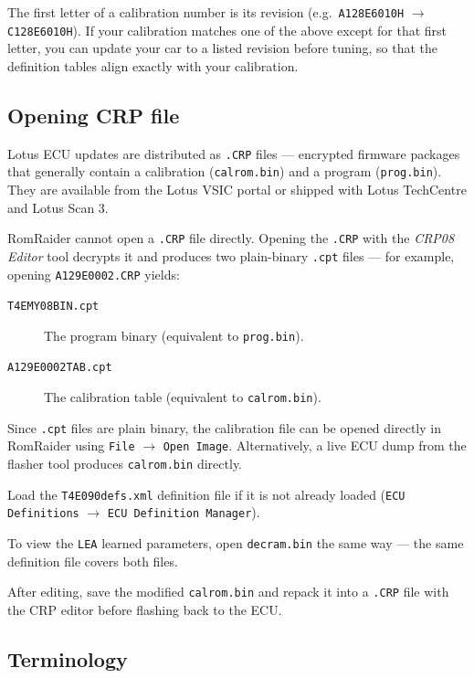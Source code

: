 \documentclass[a4paper,11pt]{article}
\renewcommand{\_}{\oldunderscore\allowbreak}
\begin{document}
The first letter of a calibration number is its revision
(e.g.\ \texttt{A128E6010H} $\to$ \texttt{C128E6010H}). If your calibration
matches one of the above except for that first letter, you can update your car
to a listed revision before tuning, so that the definition tables align exactly
with your calibration.

\subsection{Opening CRP file}

Lotus ECU updates are distributed as \texttt{.CRP} files — encrypted firmware
packages that generally contain a calibration (\texttt{calrom.bin}) and a program
(\texttt{prog.bin}). They are available from the Lotus VSIC portal or shipped
with Lotus TechCentre and Lotus Scan 3.

RomRaider cannot open a \texttt{.CRP} file directly. Opening the \texttt{.CRP}
with the \emph{CRP08 Editor} tool decrypts it and produces two plain-binary
\texttt{.cpt} files — for example, opening \texttt{A129E0002.CRP} yields:

\begin{description}
  \item[\texttt{T4E\_MY08\_BIN.cpt}] The program binary (equivalent to
    \texttt{prog.bin}).
  \item[\texttt{A129E0002\_TAB.cpt}] The calibration table (equivalent to
    \texttt{calrom.bin}).
\end{description}

Since \texttt{.cpt} files are plain binary, the calibration file can be opened
directly in RomRaider using \texttt{File} $\to$ \texttt{Open Image}.
Alternatively, a live ECU dump from the flasher tool produces \texttt{calrom.bin}
directly.

Load the \texttt{T4E090\_defs.xml} definition file if it is not already loaded
(\texttt{ECU Definitions} $\to$ \texttt{ECU Definition Manager}).

To view the \texttt{LEA\_} learned parameters, open \texttt{decram.bin} the
same way — the same definition file covers both files.

After editing, save the modified \texttt{calrom.bin} and repack it into a
\texttt{.CRP} file with the CRP editor before flashing back to the ECU.

\subsection{Terminology}
\end{document}
